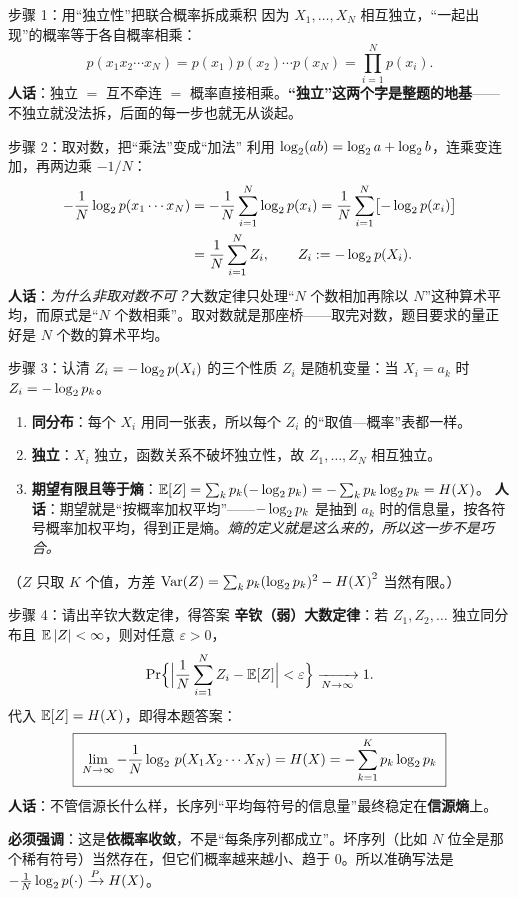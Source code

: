 \documentclass[11pt,a4paper]{ctexart}
\begin{document}
\begin{calc}{步骤 1：用“独立性”把联合概率拆成乘积}
因为 $X_1,\dots,X_N$ 相互独立，“一起出现”的概率等于各自概率相乘：
\begin{equation*}
p(x_1x_2\cdots x_N)=p(x_1)p(x_2)\cdots p(x_N)=\prod_{i=1}^{N}p(x_i).
\end{equation*}
\textbf{人话}：独立 $=$ 互不牵连 $=$ 概率直接相乘。\textbf{“独立”这两个字是整题的地基}——不独立就没法拆，后面的每一步也就无从谈起。
\end{calc}

\begin{calc}{步骤 2：取对数，把“乘法”变成“加法”}
利用 $\log_{2}(ab)=\log_{2} a+\log_{2} b$，连乘变连加，再两边乘 $-1/N$：
\begin{align*}
-\frac1N\log_{2} p(x_1\cdots x_N)
&=-\frac1N\sum_{i=1}^{N}\log_{2} p(x_i)
=\frac1N\sum_{i=1}^{N}\bigl[-\log_{2} p(x_i)\bigr]\notag\\
&=\frac1N\sum_{i=1}^{N}Z_i,\qquad Z_i:=-\log_{2} p(X_i).
\end{align*}
\textbf{人话}：\emph{为什么非取对数不可？}大数定律只处理“$N$ 个数相加再除以 $N$”这种算术平均，而原式是“$N$ 个数相乘”。取对数就是那座桥——取完对数，题目要求的量正好是 $N$ 个数的算术平均。
\end{calc}

\begin{calc}{步骤 3：认清 $Z_i=-\log_{2} p(X_i)$ 的三个性质}
$Z_i$ 是随机变量：当 $X_i=a_k$ 时 $Z_i=-\log_{2} p_k$。
\begin{enumerate}[leftmargin=1.5em,itemsep=1pt,topsep=1pt]
  \item \textbf{同分布}：每个 $X_i$ 用同一张表，所以每个 $Z_i$ 的“取值—概率”表都一样。
  \item \textbf{独立}：$X_i$ 独立，函数关系不破坏独立性，故 $Z_1,\dots,Z_N$ 相互独立。
  \item \textbf{期望有限且等于熵}：$\operatorname{\mathbb{E}}[Z]=\sum_k p_k(-\log_{2} p_k)=-\sum_k p_k\log_{2} p_k=H\!\left(X\right)$。
  \textbf{人话}：期望就是“按概率加权平均”——$-\log_{2} p_k$ 是抽到 $a_k$ 时的信息量，按各符号概率加权平均，得到正是熵。\emph{熵的定义就是这么来的，所以这一步不是巧合。}
\end{enumerate}
（$Z$ 只取 $K$ 个值，方差 $\mathrm{Var}(Z)=\sum_kp_k(\log_{2} p_k)^2-H\!\left(X\right)^2$ 当然有限。）
\end{calc}

\begin{calc}{步骤 4：请出辛钦大数定律，得答案}
\textbf{辛钦（弱）大数定律}：若 $Z_1,Z_2,\dots$ 独立同分布且 $\operatorname{\mathbb{E}}|Z|<\infty$，则对任意 $\varepsilon>0$，
\[
\Pr\Bigl\{\Bigl|\frac1N\sum_{i=1}^{N}Z_i-\operatorname{\mathbb{E}}[Z]\Bigr|<\varepsilon\Bigr\}\xrightarrow[N\to\infty]{}1 .
\]
代入 $\operatorname{\mathbb{E}}[Z]=H\!\left(X\right)$，即得本题答案：
\begin{equation*}
\boxed{\ \lim_{N\to\infty}-\frac1N\lb\,p(X_1X_2\cdots X_N)=\Hx{X}=-\sum_{k=1}^{K}p_k\lb p_k\ }
\end{equation*}
\textbf{人话}：不管信源长什么样，长序列“平均每符号的信息量”最终稳定在\textbf{信源熵}上。

\textbf{必须强调}：这是\textbf{依概率收敛}，不是“每条序列都成立”。坏序列（比如 $N$ 位全是那个稀有符号）当然存在，但它们概率越来越小、趋于 $0$。所以准确写法是 $-\frac1N\log_{2} p(\cdot)\xrightarrow{P}H\!\left(X\right)$。
\end{calc}
\end{document}
